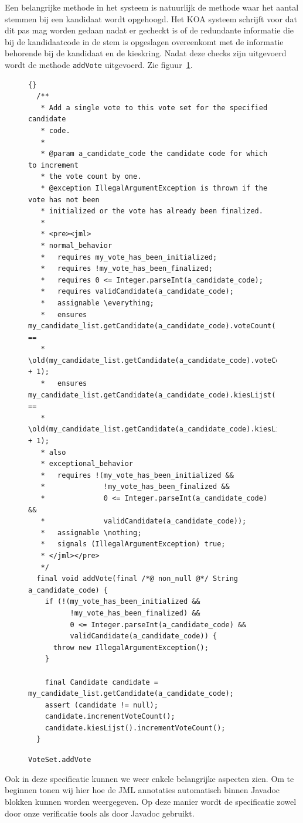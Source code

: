 \documentclass{article}
\begin{document}
Een belangrijke methode in het systeem is natuurlijk de methode waar het aantal
stemmen bij een kandidaat wordt opgehoogd. Het KOA systeem schrijft voor dat 
dit pas mag worden gedaan nadat er gecheckt is of de redundante informatie die
bij de kandidaatcode in de stem is opgeslagen overeenkomt met de informatie
behorende bij de kandidaat en de kieskring.
Nadat deze checks zijn uitgevoerd wordt de methode \texttt{addVote} uitgevoerd.
Zie figuur~\ref{fig:addvote}.
\begin{figure}[htbp]
  \begin{center}
    \begin{lstlisting}{}
  /**
   * Add a single vote to this vote set for the specified candidate
   * code.
   *
   * @param a_candidate_code the candidate code for which to increment
   * the vote count by one.
   * @exception IllegalArgumentException is thrown if the vote has not been
   * initialized or the vote has already been finalized.
   *
   * <pre><jml>
   * normal_behavior
   *   requires my_vote_has_been_initialized;
   *   requires !my_vote_has_been_finalized;
   *   requires 0 <= Integer.parseInt(a_candidate_code);
   *   requires validCandidate(a_candidate_code);
   *   assignable \everything;
   *   ensures my_candidate_list.getCandidate(a_candidate_code).voteCount() ==
   *           \old(my_candidate_list.getCandidate(a_candidate_code).voteCount() + 1);
   *   ensures my_candidate_list.getCandidate(a_candidate_code).kiesLijst().voteCount() ==
   *           \old(my_candidate_list.getCandidate(a_candidate_code).kiesLijst().voteCount() + 1);
   * also
   * exceptional_behavior
   *   requires !(my_vote_has_been_initialized &&
   *              !my_vote_has_been_finalized &&
   *              0 <= Integer.parseInt(a_candidate_code) &&
   *              validCandidate(a_candidate_code));
   *   assignable \nothing;
   *   signals (IllegalArgumentException) true;
   * </jml></pre>
   */
  final void addVote(final /*@ non_null @*/ String a_candidate_code) {
    if (!(my_vote_has_been_initialized &&
          !my_vote_has_been_finalized) &&
          0 <= Integer.parseInt(a_candidate_code) &&
          validCandidate(a_candidate_code)) {
      throw new IllegalArgumentException();
    }

    final Candidate candidate = my_candidate_list.getCandidate(a_candidate_code);
    assert (candidate != null);
    candidate.incrementVoteCount();
    candidate.kiesLijst().incrementVoteCount();
  }
    \end{lstlisting}
    \caption{\texttt{VoteSet.addVote}}
    \label{fig:addvote}
  \end{center}
\end{figure}
Ook in deze specificatie kunnen we weer enkele belangrijke aspecten zien.
Om te beginnen tonen wij hier hoe de JML annotaties automatisch binnen Javadoc
blokken kunnen worden weergegeven. Op deze manier wordt de specificatie zowel
door onze verificatie tools als door Javadoc gebruikt.
\end{document}

